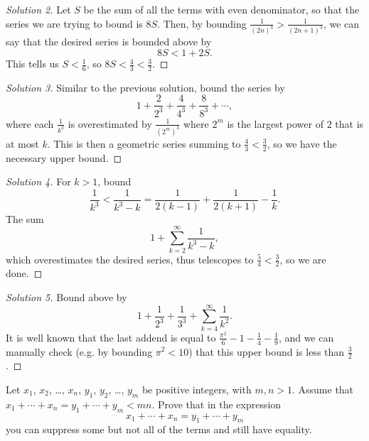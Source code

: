 \documentclass[11pt]{scrartcl}
\begin{document}
\begin{proof}[Solution 2]
	Let $S$ be the sum of all the terms with even denominator,
	so that the series we are trying to bound is $8S$.
	Then, by bounding $\frac{1}{(2n)^3} > \frac{1}{(2n + 1)^3}$, we can say
	that the desired series is bounded above by
	\[8S < 1 + 2S.\]
	This tells us $S < \frac 16$, so $8S < \frac43 < \frac32$.
\end{proof}

\begin{proof}[Solution 3]
	Similar to the previous solution, bound the series by
	\[1 + \frac{2}{2^3} + \frac{4}{4^3} + \frac{8}{8^3} + \cdots,\]
	where each $\frac1{k^3}$ is overestimated by $\frac1{(2^m)^3}$
	where $2^m$ is the largest power of $2$ that is at most $k$.
	This is then a geometric series summing to $\frac43 < \frac32$,
	so we have the necessary upper bound.
\end{proof}

\begin{proof}[Solution 4]
	For $k > 1$, bound
	\[\frac{1}{k^3} < \frac{1}{k^3 - k} =
	\frac{1}{2(k - 1)} + \frac{1}{2(k + 1)} - \frac{1}{k}.\]
	The sum
	\[1 + \sum_{k=2}^\infty \frac{1}{k^3 - k},\]
	which overestimates the desired series, thus telescopes to
	$\frac54 < \frac32$, so we are done.
\end{proof}

\begin{proof}[Solution 5]
	Bound above by
	\[1 + \frac1{2^3} + \frac1{3^3} + \sum_{k=4}^\infty \frac1{k^2}.\]
	It is well known that the last addend is equal to
	$\frac{\pi^2}{6} - 1 - \frac14 - \frac19$, and we can manually check
	(e.g. by bounding $\pi^2 < 10$)
	that this upper bound is less than $\frac32$.
\end{proof}

\begin{problem}
	Let $x_1$, $x_2$, \dots, $x_n$, $y_1$, $y_2$, \dots, $y_m$
	be positive integers, with $m, n>1$. Assume that
	$x_1 + \cdots + x_n = y_1 + \cdots + y_m < mn$.
	Prove that in the expression
	\[x_1 + \cdots + x_n = y_1 + \cdots + y_m\]
	you can suppress some but not all of the terms and still have equality.
\end{problem}
\end{document}
